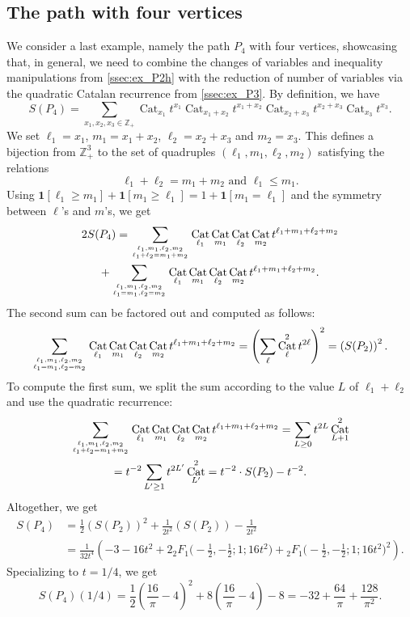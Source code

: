 \documentclass[12pt]{amsart}
\theoremstyle{plain}
\theoremstyle{remark}
\def\Z{\mathbb{Z}}
\def\One{\bm{1}}
\DeclareMathOperator{\Cat}{Cat}
\begin{document}
\subsection{The path with four vertices}
\label{ssec:ex_P4}
We consider a last example, namely the path $P_4$ with four vertices,
 showcasing that, in general, we need to combine the changes of variables and inequality manipulations from \cref{ssec:ex_P2h}
with the reduction of number of variables via the quadratic Catalan recurrence from \cref{ssec:ex_P3}.
By definition, we have
\[S(P_4)=  \sum_{x_1,x_2,x_3 \in \Z_+} \Cat_{x_1} t^{x_1} \Cat_{x_1+x_2} t^{x_1+x_2} \Cat_{x_2+x_3} t^{x_2+x_3}
\Cat_{x_3} t^{x_3}.\]
We set $\ell_1=x_1$, $m_1=x_1+x_2$, $\ell_2=x_2+x_3$ and $m_2=x_3$. This defines a bijection from $\Z_+^3$ to the set of quadruples $(\ell_1,m_1,\ell_2,m_2)$ satisfying the relations
\[\ell_1+\ell_2=m_1+m_2 \text{ and }\ell_1 \le m_1.\]
Using $\One[\ell_1 \ge m_1] + \One[m_1 \ge \ell_1] = 1 + \One[m_1=\ell_1]$ and the symmetry between $\ell$'s and $m$'s,
we get
\begin{multline*}
2 S(P_4) = \sum_{\ell_1,m_1,\ell_2,m_2 \atop
 \ell_1+\ell_2=m_1+m_2} \Cat_{\ell_1} \Cat_{m_1} \Cat_{\ell_2} \Cat_{m_2} t^{\ell_1+m_1+\ell_2+m_2} \\ + \sum_{\ell_1,m_1,\ell_2,m_2 \atop
 \ell_1=m_1, \ell_2=m_2} \Cat_{\ell_1} \Cat_{m_1} \Cat_{\ell_2} \Cat_{m_2} t^{\ell_1+m_1+\ell_2+m_2}. 
\end{multline*}
The second sum can be factored out and computed as follows:
\[\sum_{\ell_1,m_1,\ell_2,m_2 \atop
 \ell_1=m_1, \ell_2=m_2} \Cat_{\ell_1} \Cat_{m_1} \Cat_{\ell_2} \Cat_{m_2} t^{\ell_1+m_1+\ell_2+m_2} = \left( \sum_{\ell} \Cat_{\ell}^2 t^{2\ell} \right)^2 = \left( S(P_2) \right)^2.\]
To compute the first sum, we split the sum according to the value $L$ of 
 $\ell_1+\ell_2$ and use the quadratic recurrence:
 \begin{multline*}
\sum_{\ell_1,m_1,\ell_2,m_2 \atop
 \ell_1+\ell_2=m_1+m_2} \Cat_{\ell_1} \Cat_{m_1} \Cat_{\ell_2} \Cat_{m_2} t^{\ell_1+m_1+\ell_2+m_2}=
 \sum_{L \ge 0} t^{2L} \Cat_{L+1}^2\\
 = t^{-2} \sum_{L' \ge 1} t^{2L'} \Cat_{L'}^2
 = t^{-2} \cdot S(P_2)  - t^{-2}.
 \end{multline*}
Altogether, we get
\begin{align*}
S(P_4) &= \frac12  \left( S(P_2) \right)^2
+ \frac{1}{2t^2} \left( S(P_2) \right) - \frac{1}{2t^2}\\
&=\frac{1}{32t^4}\left(-3 - 16 t^2 + 
  2{}_{2}^{}{{}{{}{F_{1}^{}}}}\big(-\tfrac12, -\tfrac12 ; 1 ; 16 t^2\big) + 
  {}_{2}^{}{{}{{}{F_{1}^{}}}}\big(-\tfrac12, -\tfrac12 ; 1 ; 16 t^2\big)^2\right) .
\end{align*}
Specializing to $t=1/4$, we get
\[S(P_4)(1/4)  = \frac12  \left( \frac{16}{\pi}-4 \right)^2
+ 8 \left( \frac{16}{\pi}-4 \right) - 8=-32 + \frac{64}{\pi} + \frac{128}{\pi^2} .\]
\end{document}
